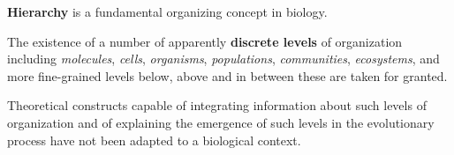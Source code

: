 \begin{frame}
\begin{block}{}
\textbf{Hierarchy} is a fundamental organizing concept in biology. 
\end{block}
\begin{block}{}
The existence of a number of apparently \textbf{discrete levels} of organization including {\it molecules}, {\it cells}, {\it organisms}, {\it populations}, {\it communities}, {\it ecosystems}, and more fine-grained levels below, above and in between these are taken for granted. 
\end{block}
\begin{block}{}
Theoretical constructs capable of integrating information about such levels of organization and of explaining the emergence of such levels in the evolutionary process have not been adapted to a biological context.
\end{block}
\end{frame}